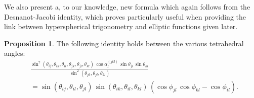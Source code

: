 \documentclass[fleqn,11pt,twoside]{article}
\theoremstyle{definition}
\newtheorem{prop}{Proposition}
\begin{document}
We also present a, to our knowledge, new formula which again follows from the Desnanot-Jacobi 
identity, which proves particularly useful when providing the link between hyperspherical trigonometry 
and elliptic functions given later.  
\begin{prop} The following identity holds between the various tetrahedral angles: 
\begin{equation}
\begin{split} 
&  \frac{\sin^2(\theta_{ij},\theta_{ik},\theta_{il},\theta_{jk},\theta_{jl},\theta_{kl})\, 
\cos\alpha_l^{(jkl)}\,\sin\theta_{jl}\,\sin\theta_{kl}}{\sin^2(\theta_{jk},\theta_{jl},\theta_{kl})} \\ 
& = \sin(\theta_{ij},\theta_{il},\theta_{jl})\,\sin(\theta_{ik},\theta_{il},\theta_{kl})\,
\left(\cos\phi_{jl}\,\cos\phi_{kl}-\cos\phi_{il}\right). 
\end{split}
\end{equation}
\end{prop} 
\end{document}
